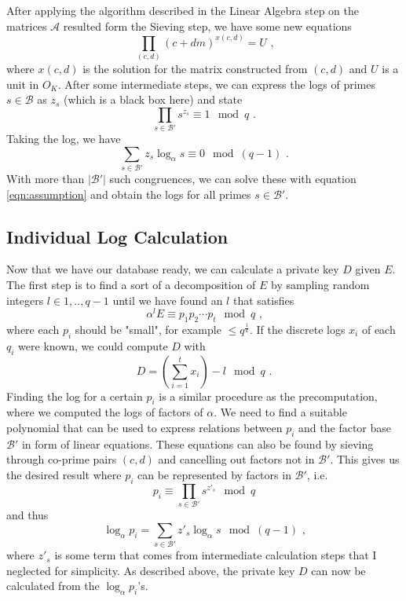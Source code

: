\documentclass[paper=a4, fontsize=11pt]{scrartcl} %
\numberwithin{equation}{section} %
\numberwithin{figure}{section} %
\numberwithin{table}{section} %
\begin{document}
After applying the algorithm described in the Linear Algebra step on the matrices $\mathcal{A}$ resulted form the Sieving step, we have some new equations
\begin{equation}
\prod_{(c,d)}(c+dm)^{x(c,d)} = U
\textit{ ,}
\end{equation}
where $x(c,d)$ is the solution for the matrix constructed from $(c,d)$ and $U$ is a unit in $O_K$. After some intermediate steps, we can express the logs of primes $s\in\mathcal{B}$ as $z_s$ (which is a black box here) and state
\begin{equation}
\prod_{s\in\mathcal{B}'}s^{z_s}\equiv 1\mod q
\text{ .}
\end{equation}
Taking the log, we have
\begin{equation}
\sum_{s\in\mathcal{B}'}z_s\log_\alpha s \equiv 0 \mod (q-1)
\text{ .}
\end{equation}
With more than $|\mathcal{B}'|$ such congruences, we can solve these with equation \ref{eqn:assumption} and obtain the logs for all primes $s\in\mathcal{B}'$.

\subsection{Individual Log Calculation}
\label{subsec:indiviualLogCalculation}
Now that we have our database ready, we can calculate a private key $D$ given $E$. The first step is to find a sort of a decomposition of $E$ by sampling random integers $l\in{1,..,q-1}$ until we have found an $l$ that satisfies
\begin{equation}
\alpha^lE\equiv p_1p_2\cdots p_t\mod q
\text{ ,}
\end{equation}
where each $p_i$ should be "small", for example $\leq q^\frac{1}{k}$. If the discrete logs $x_i$ of each $q_i$ were known, we could compute $D$ with
\begin{equation}
D = \left(\sum_{i=1}^{t}x_i\right)-l \mod q
\text{ .}
\end{equation}
Finding the log for a certain $p_i$ is a similar procedure as the precomputation, where we computed the logs of factors of $\alpha$. We need to find a suitable polynomial that can be used to express relations between $p_i$ and the factor base $\mathcal{B}'$ in form of linear equations. These equations can also be found by sieving through co-prime pairs $(c,d)$ and cancelling out factors not in $\mathcal{B}'$. This gives us the desired result where $p_i$ can be represented by factors in $\mathcal{B}'$, i.e.
\begin{equation}
p_i \equiv \prod_{s\in\mathcal{B}'}s^{z'_s} \mod q
\end{equation}
and thus
\begin{equation}
\log_{\alpha}p_i = \sum_{s\in\mathcal{B}'}z'_s\log_{\alpha}s \mod (q-1)
\text{ ,}
\end{equation}
where $z'_s$ is some term that comes from intermediate calculation steps that I neglected for simplicity. As described above, the private key $D$ can now be calculated from the $\log_{\alpha}p_i$'s.
\end{document}
